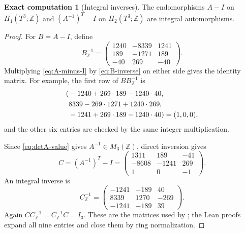 \documentclass[10pt,reqno]{amsart}
\theoremstyle{definition}
\newtheorem{computation}[theorem]{Exact computation}
\theoremstyle{remark}
\newcommand{\Z}{\mathbb Z}
\begin{document}
\begin{computation}[Integral inverses]\label{comp:lattice-inverses}
The endomorphisms $A-I$ on $H_1(T^3;\Z)$ and
$(A^{-1})^T-I$ on $H_2(T^3;\Z)$ are integral automorphisms.
\end{computation}

\begin{proof}
For $B=A-I$, define
\begin{equation}\label{eq:B-inverse}
B^{-1}_{\Z}=
\begin{pmatrix}
1240&-8339&1241\\
189&-1271&189\\
-40&269&-40
\end{pmatrix}.
\end{equation}
Multiplying \cref{eq:A-minus-I} by \cref{eq:B-inverse} on either side gives
the identity matrix.  For example, the first row of $BB^{-1}_{\Z}$ is
\begin{align}
(&-1240+269\cdot189-1240\cdot40,\notag\\
 &8339-269\cdot1271+1240\cdot269,\notag\\
 &-1241+269\cdot189-1240\cdot40)=(1,0,0),
\end{align}
and the other six entries are checked by the same integer multiplication.

Since \cref{eq:detA-value} gives $A^{-1}\in M_3(\Z)$, direct inversion gives
\begin{equation}\label{eq:H2-map}
C=(A^{-1})^T-I=
\begin{pmatrix}
1311&189&-41\\
-8608&-1241&269\\
1&0&-1
\end{pmatrix}.
\end{equation}
An integral inverse is
\begin{equation}\label{eq:H2-inverse}
C^{-1}_{\Z}=
\begin{pmatrix}
-1241&-189&40\\
8339&1270&-269\\
-1241&-189&39
\end{pmatrix}.
\end{equation}
Again $CC^{-1}_{\Z}=C^{-1}_{\Z}C=I_3$.  These are the matrices used by
; the Lean proofs expand all nine entries and close
them by ring normalization.
\end{proof}
\end{document}
